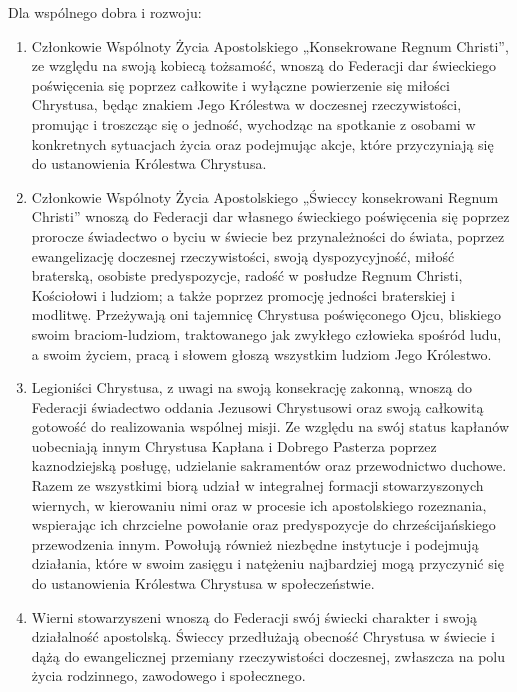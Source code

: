 

 Dla wspólnego dobra i rozwoju:


\begin{enumerate}


\item Członkowie Wspólnoty Życia Apostolskiego „Konsekrowane Regnum Christi”, ze względu na swoją kobiecą tożsamość, wnoszą do Federacji dar świeckiego poświęcenia się poprzez całkowite i wyłączne powierzenie się miłości Chrystusa, będąc znakiem Jego Królestwa w doczesnej rzeczywistości, promując i troszcząc się o jedność, wychodząc na spotkanie z osobami w konkretnych sytuacjach życia oraz podejmując akcje, które przyczyniają się do ustanowienia Królestwa Chrystusa.


\item Członkowie Wspólnoty Życia Apostolskiego „Świeccy konsekrowani Regnum Christi” wnoszą do Federacji dar własnego świeckiego poświęcenia się  poprzez prorocze świadectwo o byciu w świecie bez przynależności do świata, poprzez ewangelizację doczesnej rzeczywistości, swoją dyspozycyjność, miłość braterską, osobiste predyspozycje, radość w posłudze Regnum Christi, Kościołowi i ludziom; a także poprzez promocję jedności braterskiej i modlitwę. Przeżywają oni tajemnicę Chrystusa poświęconego Ojcu, bliskiego swoim braciom-ludziom, traktowanego jak zwykłego człowieka spośród ludu, a swoim życiem, pracą i słowem głoszą wszystkim ludziom Jego Królestwo.


\item Legioniści Chrystusa, z uwagi na swoją konsekrację zakonną, wnoszą do Federacji świadectwo oddania Jezusowi Chrystusowi oraz swoją całkowitą gotowość do realizowania wspólnej misji. Ze względu na swój status kapłanów uobecniają innym Chrystusa Kapłana i Dobrego Pasterza poprzez kaznodziejską posługę, udzielanie sakramentów oraz przewodnictwo duchowe. Razem ze wszystkimi biorą udział w integralnej formacji stowarzyszonych wiernych, w kierowaniu nimi oraz w procesie ich apostolskiego rozeznania, wspierając ich chrzcielne powołanie oraz predyspozycje do chrześcijańskiego przewodzenia innym. Powołują również niezbędne instytucje i podejmują działania, które w swoim zasięgu i natężeniu najbardziej mogą przyczynić się do ustanowienia Królestwa Chrystusa w społeczeństwie.


\item Wierni stowarzyszeni wnoszą do Federacji swój świecki charakter i swoją działalność apostolską. Świeccy przedłużają obecność Chrystusa w świecie i dążą do ewangelicznej przemiany rzeczywistości doczesnej, zwłaszcza na polu życia rodzinnego, zawodowego i społecznego.


\end{enumerate}


